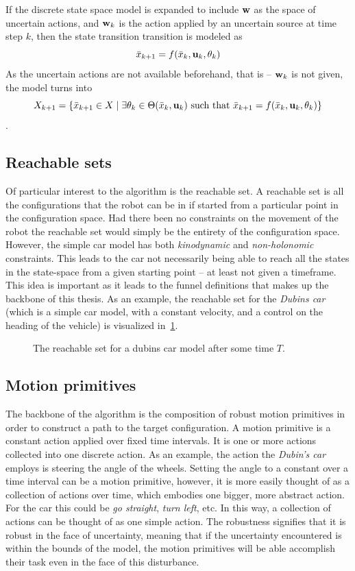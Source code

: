 If the discrete state space model is expanded to include \(\mathbf{w}\) as the space of
uncertain actions, and \(\mathbf{w}_k\) is the action applied by an uncertain source at
time step \(k\), then the state transition transition is modeled as
\[
  \bar{x}_{k+1} = f(\bar{x}_k,\mathbf{u}_k,\theta_k)
\]
As the uncertain actions are not available beforehand, that is -- \(\mathbf{w}_ k\) is
not given, the model turns into
\[
  X_{k+1} = \lbrace \bar{x}_{k+1} \in X \mid \exists\theta_k \in \Theta(\bar{x}_k,\mathbf{u}_k)
    \text{ such that } \bar{x}_{k+1} = f(\bar{x}_k,\mathbf{u}_k,\theta_k)\rbrace
\] \cite{Lav06}.

\subsection{Reachable sets}
\label{subsec:reachable-set}

Of particular interest to the \rrtfunnel{} algorithm is the reachable set. A
reachable set is all the configurations that the robot can be in if started from
a particular point in the configuration space. Had there been no constraints on
the movement of the robot the reachable set would simply be the entirety of the
configuration space. However, the simple car model has both \textit{kinodynamic}
and \textit{non-holonomic} constraints. This leads to the car not necessarily
being able to reach all the states in the state-space from a given starting
point -- at least not given a timeframe. This idea is important as it leads to
the funnel definitions that makes up the backbone of this thesis. As an example,
the reachable set for the \textit{Dubins car} (which is a simple car model, with
a constant velocity, and a control on the heading of the vehicle) is visualized
in~\cref{fig:reachable-set-dubin}.

\begin{figure}
  \centering 
  \caption{The reachable set for a dubins car model after some time \(T\).}
  \label{fig:reachable-set-dubin}
\end{figure}

\subsection{Motion primitives}

The backbone of the \rrtfunnel{} algorithm is the composition of robust motion
primitives in order to construct a path to the target configuration. A motion
primitive is a constant action applied over fixed time intervals. It is one or
more actions collected into one discrete action. As an example, the action the
\textit{Dubin's car} employs is steering the angle of the wheels. Setting the
angle to a constant over a time interval can be a motion primitive, however, it
is more easily thought of as a collection of actions over time, which embodies
one bigger, more abstract action. For the car this could be \textit{go
  straight}, \textit{turn left}, etc. In this way, a collection of actions can
be thought of as one simple action. The robustness signifies that it is robust
in the face of uncertainty, meaning that if the uncertainty encountered is
within the bounds of the model, the motion primitives will be able accomplish
their task even in the face of this disturbance.

